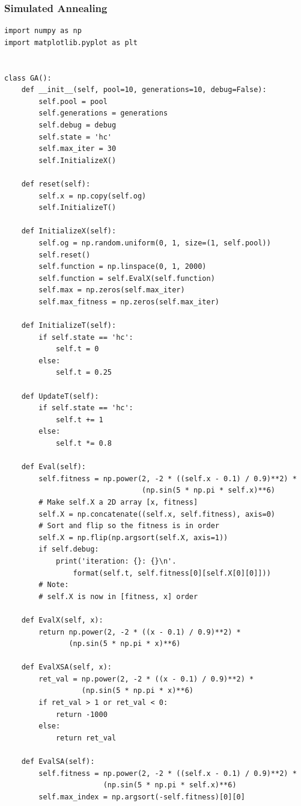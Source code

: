 \documentclass[12pt]{article}
\begin{document}
\subsubsection{Simulated Annealing}
\begin{lstlisting}
import numpy as np
import matplotlib.pyplot as plt


class GA():
    def __init__(self, pool=10, generations=10, debug=False):
        self.pool = pool
        self.generations = generations
        self.debug = debug
        self.state = 'hc'
        self.max_iter = 30
        self.InitializeX()

    def reset(self):
        self.x = np.copy(self.og)
        self.InitializeT()

    def InitializeX(self):
        self.og = np.random.uniform(0, 1, size=(1, self.pool))
        self.reset()
        self.function = np.linspace(0, 1, 2000)
        self.function = self.EvalX(self.function)
        self.max = np.zeros(self.max_iter)
        self.max_fitness = np.zeros(self.max_iter)

    def InitializeT(self):
        if self.state == 'hc':
            self.t = 0
        else:
            self.t = 0.25

    def UpdateT(self):
        if self.state == 'hc':
            self.t += 1
        else:
            self.t *= 0.8

    def Eval(self):
        self.fitness = np.power(2, -2 * ((self.x - 0.1) / 0.9)**2) * 
                                (np.sin(5 * np.pi * self.x)**6)
        # Make self.X a 2D array [x, fitness]
        self.X = np.concatenate((self.x, self.fitness), axis=0)
        # Sort and flip so the fitness is in order
        self.X = np.flip(np.argsort(self.X, axis=1))
        if self.debug:
            print('iteration: {}: {}\n'.
                format(self.t, self.fitness[0][self.X[0][0]]))
        # Note:
        # self.X is now in [fitness, x] order

    def EvalX(self, x):
        return np.power(2, -2 * ((x - 0.1) / 0.9)**2) * 
               (np.sin(5 * np.pi * x)**6)

    def EvalXSA(self, x):
        ret_val = np.power(2, -2 * ((x - 0.1) / 0.9)**2) *
                  (np.sin(5 * np.pi * x)**6)
        if ret_val > 1 or ret_val < 0:
            return -1000
        else:
            return ret_val

    def EvalSA(self):
        self.fitness = np.power(2, -2 * ((self.x - 0.1) / 0.9)**2) *
                       (np.sin(5 * np.pi * self.x)**6)
        self.max_index = np.argsort(-self.fitness)[0][0]


\end{lstlisting}
\end{document}
